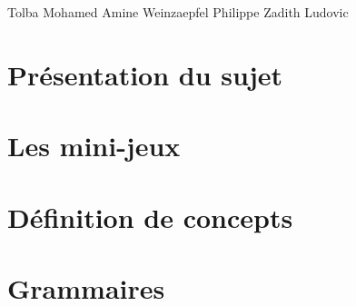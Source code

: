 \documentclass[a4paper,10pt]{article}
\begin{document}
\vspace{0.2cm}
\noindent
Tolba Mohamed Amine \hspace{0.8cm} Weinzaepfel Philippe \hspace{1.2cm} Zadith Ludovic

\vspace{5cm}

\normalsize
\begin{abstract}
 Ce document présente la partie analyse du projet de master 1 intitulé "Plateforme de création de mini-jeux 3D sur le WEB".
 Il consiste à concevoir et à développer un outil auteur pour créer des contenus 3D très interactifs dans les pages internet.
 En particulier, il s'agit de définir un langage permettant de générer le code de mini-jeux affichés en 3D.
 Le rapport est divisé en 4 parties : la partie \ref{sec:sujet} présente de manière plus précise le sujet.
 La seconde utilise l'exemple de différents mini-jeux pour appuyer l'analyse du contenu d'un mini-jeu.
 La partie \ref{sec:concept} définit les concepts récurrents dans l'univers des jeux.
 Enfin, la dernière partie présente les grammaires proposées.
\end{abstract}

\clearpage

\vspace{0.5cm}
\section{Présentation du sujet}
\label{sec:sujet}
\vspace{0.5cm}
 

\vspace{0.5cm}
\section{Les mini-jeux}
\label{sec:minijeux}
\vspace{0.5cm}


\section{Définition de concepts}
\label{sec:concept}


\section{Grammaires}
\label{sec:grammaire}

\end{document}
